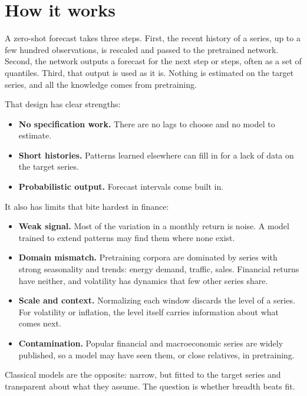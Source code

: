 \section{How it works}
\label{sec:21-how}

A zero-shot forecast takes three steps. First, the recent history of a series, up to a few hundred observations, is rescaled and passed to the pretrained network. Second, the network outputs a forecast for the next step or steps, often as a set of quantiles. Third, that output is used as it is. Nothing is estimated on the target series, and all the knowledge comes from pretraining.

That design has clear strengths:

\begin{itemize}
  \item \textbf{No specification work.} There are no lags to choose and no model to estimate.
  \item \textbf{Short histories.} Patterns learned elsewhere can fill in for a lack of data on the target series.
  \item \textbf{Probabilistic output.} Forecast intervals come built in.
\end{itemize}

It also has limits that bite hardest in finance:

\begin{itemize}
  \item \textbf{Weak signal.} Most of the variation in a monthly return is noise. A model trained to extend patterns may find them where none exist.
  \item \textbf{Domain mismatch.} Pretraining corpora are dominated by series with strong seasonality and trends: energy demand, traffic, sales. Financial returns have neither, and volatility has dynamics that few other series share.
  \item \textbf{Scale and context.} Normalizing each window discards the level of a series. For volatility or inflation, the level itself carries information about what comes next.
  \item \textbf{Contamination.} Popular financial and macroeconomic series are widely published, so a model may have seen them, or close relatives, in pretraining.
\end{itemize}

Classical models are the opposite: narrow, but fitted to the target series and transparent about what they assume. The question is whether breadth beats fit.

